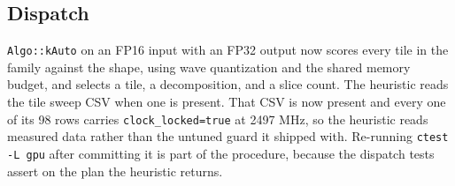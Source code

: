 \subsection{Dispatch}

\texttt{Algo::kAuto} on an FP16 input with an FP32 output now scores every tile in
the family against the shape, using wave quantization and the shared memory
budget, and selects a tile, a decomposition, and a slice count. The heuristic
reads the tile sweep CSV when one is present. That CSV is now present and every one
of its 98 rows carries \texttt{clock\_locked=true} at 2497 MHz, so the heuristic
reads measured data rather than the untuned guard it shipped with. Re-running
\texttt{ctest -L gpu} after committing it is part of the procedure, because the
dispatch tests assert on the plan the heuristic returns.

\begin{table}[htbp]
\centering

\caption{The decomposition mechanisms, what each one is meant to fix, and what the
locked clock sweep measured. The speedup cells are ratios against the data parallel
mainloop at the same shape, computed by the generator from the committed rows; a
range is given rather than a single number because both alternatives win at some
shapes and lose at others, and that spread is the result.}
\label{tab:decomp}
\end{table}
